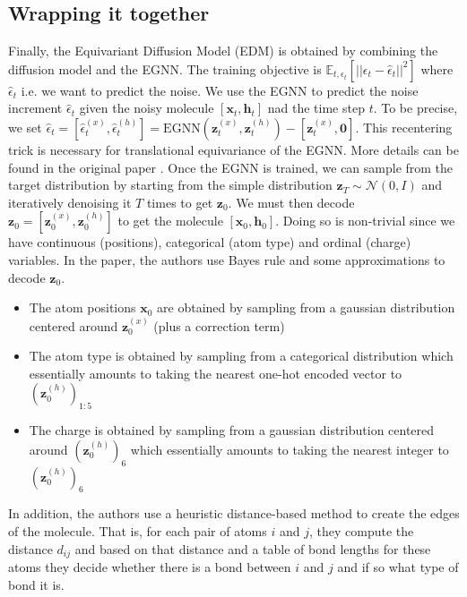 \documentclass[sigconf]{acmart}
\begin{document}
\subsection{Wrapping it together}
Finally, the Equivariant Diffusion Model (EDM) is obtained by combining the diffusion model and the EGNN.
The training objective is $\mathbb{E}_{t, \epsilon_t}[||\epsilon_t - \hat{\epsilon}_t||^2]$ where $\hat{\epsilon}_t$ i.e. we want to predict the noise.
We use the EGNN to predict the noise increment $\hat{\epsilon}_t$ given the noisy molecule $\left[ \mathbf{x}_t, \mathbf{h}_t \right]$ nad the time step $t$.
To be precise, we set $\hat{\epsilon}_t = \left[ \hat{\epsilon}_t^{(x)}, \hat{\epsilon}_t^{(h)} \right] 
= \text{EGNN}(\mathbf{z}_t^{(x)}, \mathbf{z}_t^{(h)}) - \left[ \mathbf{z}_t^{(x)}, \mathbf{0} \right]$. This recentering trick is necessary for translational equivariance of the EGNN. More details can be found in the original paper \cite{edm}.
Once the EGNN is trained, we can sample from the target distribution by starting from the simple distribution $\mathbf{z}_T \sim \mathcal{N}(0, I)$ and iteratively denoising it $T$ times to get $\mathbf{z}_0$.
We must then decode $\mathbf{z}_0 = \left[ \mathbf{z}_0^{(x)}, \mathbf{z}_0^{(h)} \right]$ to get the molecule $\left[ \mathbf{x}_0, \mathbf{h}_0 \right]$. Doing so is non-trivial since we have continuous (positions), categorical (atom type) and ordinal (charge) variables.
In the paper, the authors use Bayes rule and some approximations to decode $\mathbf{z}_0$.
\begin{itemize}
    \item The atom positions $\mathbf{x}_0$ are obtained by sampling from a gaussian distribution centered around $\mathbf{z}_0^{(x)}$ (plus a correction term)
    \item The atom type is obtained by sampling from a categorical distribution which essentially amounts to taking the nearest one-hot encoded vector to $(\mathbf{z}_0^{(h)})_{1:5}$
    \item The charge is obtained by sampling from a gaussian distribution centered around $(\mathbf{z}_0^{(h)})_6$ which essentially amounts to taking the nearest integer to $(\mathbf{z}_0^{(h)})_6$
\end{itemize}
In addition, the authors use a heuristic distance-based method to create the edges of the molecule. That is, for each pair of atoms $i$ and $j$, they compute the distance $d_{ij}$ 
and based on that distance and a table of bond lengths for these atoms they decide whether there is a bond between $i$ and $j$ and if so what type of bond it is.
\end{document}
